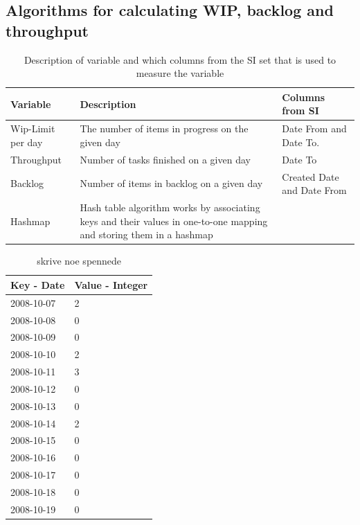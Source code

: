 \documentclass[UKenglish]{ifimaster}  %
\begin{document}
\subsection {Algorithms for calculating WIP, backlog and throughput}
\begin{table}[ht]
\begin{center}
    \begin{tabular}{| l | l | p{5cm} |}
    \hline
    Variable &	Description	 & Columns from SI\\ \hline 
    Wip-Limit per day & \parbox[t]{5cm}{The number of items in progress on the given day} & Date From and Date To. \\ \hline
    Throughput	& Number of tasks finished on a given day & Date To \\ \hline
    Backlog & Number of items in backlog on a given day & Created Date and Date From\\ \hline
 Hashmap &\parbox[t]{7cm}{Hash table algorithm works by associating keys and their values in one-to-one mapping and storing them in a hashmap \parencite{Hashmap}} & \\ \hline
\end{tabular}
\caption{Description of variable and which columns from the SI set that is used to measure the variable}
\label{IC} %
\end{center}
\end{table}

\begin{table}[ht]
\begin{center}
    \begin{tabular}{| l | p{5cm} |}
    \hline
     Key - Date  & Value - Integer\\ \hline
     2008-10-07 & 2   \\ \hline
     2008-10-08 & 0   \\ \hline
     2008-10-09 & 0   \\ \hline
     2008-10-10 & 2   \\ \hline
     2008-10-11 & 3   \\ \hline
     2008-10-12 & 0   \\ \hline
     2008-10-13 & 0   \\ \hline
     2008-10-14 & 2   \\ \hline
     2008-10-15 & 0   \\ \hline
     2008-10-16 & 0   \\ \hline
     2008-10-17 & 0   \\ \hline
     2008-10-18 & 0   \\ \hline
     2008-10-19 & 0   \\ \hline
    \end{tabular}
\caption{skrive noe spennede}
\label{IC} %
\end{center}
\end{table}
\end{document}
